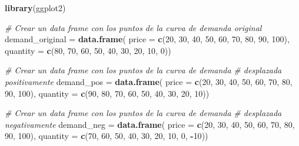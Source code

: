 \documentclass[
  spanish,
  12pt,
]{book}
\newenvironment{Shaded}{\begin{snugshade}}{\end{snugshade}}
\newcommand{\AttributeTok}[1]{\textcolor[rgb]{0.13,0.29,0.53}{#1}}
\newcommand{\CommentTok}[1]{\textcolor[rgb]{0.56,0.35,0.01}{\textit{#1}}}
\newcommand{\DecValTok}[1]{\textcolor[rgb]{0.00,0.00,0.81}{#1}}
\newcommand{\FunctionTok}[1]{\textcolor[rgb]{0.13,0.29,0.53}{\textbf{#1}}}
\newcommand{\NormalTok}[1]{#1}
\newcommand{\OtherTok}[1]{\textcolor[rgb]{0.56,0.35,0.01}{#1}}
\newcommand{\SpecialCharTok}[1]{\textcolor[rgb]{0.81,0.36,0.00}{\textbf{#1}}}
\begin{document}
\begin{Shaded}
\begin{Highlighting}[]
\FunctionTok{library}\NormalTok{(ggplot2)}

\CommentTok{\# Crear un data frame con los puntos de la curva de demanda original}
\NormalTok{demand\_original }\OtherTok{=} \FunctionTok{data.frame}\NormalTok{(}
  \AttributeTok{price =} \FunctionTok{c}\NormalTok{(}\DecValTok{20}\NormalTok{, }\DecValTok{30}\NormalTok{, }\DecValTok{40}\NormalTok{, }\DecValTok{50}\NormalTok{, }\DecValTok{60}\NormalTok{, }\DecValTok{70}\NormalTok{, }\DecValTok{80}\NormalTok{, }\DecValTok{90}\NormalTok{, }\DecValTok{100}\NormalTok{),}
  \AttributeTok{quantity =} \FunctionTok{c}\NormalTok{(}\DecValTok{80}\NormalTok{, }\DecValTok{70}\NormalTok{, }\DecValTok{60}\NormalTok{, }\DecValTok{50}\NormalTok{, }\DecValTok{40}\NormalTok{, }\DecValTok{30}\NormalTok{, }\DecValTok{20}\NormalTok{, }\DecValTok{10}\NormalTok{, }\DecValTok{0}\NormalTok{))}

\CommentTok{\# Crear un data frame con los puntos de la curva de demanda }
\CommentTok{\# desplazada positivamente}
\NormalTok{demand\_pos }\OtherTok{=} \FunctionTok{data.frame}\NormalTok{(}
  \AttributeTok{price =} \FunctionTok{c}\NormalTok{(}\DecValTok{20}\NormalTok{, }\DecValTok{30}\NormalTok{, }\DecValTok{40}\NormalTok{, }\DecValTok{50}\NormalTok{, }\DecValTok{60}\NormalTok{, }\DecValTok{70}\NormalTok{, }\DecValTok{80}\NormalTok{, }\DecValTok{90}\NormalTok{, }\DecValTok{100}\NormalTok{),}
  \AttributeTok{quantity =} \FunctionTok{c}\NormalTok{(}\DecValTok{90}\NormalTok{, }\DecValTok{80}\NormalTok{, }\DecValTok{70}\NormalTok{, }\DecValTok{60}\NormalTok{, }\DecValTok{50}\NormalTok{, }\DecValTok{40}\NormalTok{, }\DecValTok{30}\NormalTok{, }\DecValTok{20}\NormalTok{, }\DecValTok{10}\NormalTok{))}

\CommentTok{\# Crear un data frame con los puntos de la curva de demanda }
\CommentTok{\# desplazada negativamente}
\NormalTok{demand\_neg }\OtherTok{=} \FunctionTok{data.frame}\NormalTok{(}
  \AttributeTok{price =} \FunctionTok{c}\NormalTok{(}\DecValTok{20}\NormalTok{, }\DecValTok{30}\NormalTok{, }\DecValTok{40}\NormalTok{, }\DecValTok{50}\NormalTok{, }\DecValTok{60}\NormalTok{, }\DecValTok{70}\NormalTok{, }\DecValTok{80}\NormalTok{, }\DecValTok{90}\NormalTok{, }\DecValTok{100}\NormalTok{),}
  \AttributeTok{quantity =} \FunctionTok{c}\NormalTok{(}\DecValTok{70}\NormalTok{, }\DecValTok{60}\NormalTok{, }\DecValTok{50}\NormalTok{, }\DecValTok{40}\NormalTok{, }\DecValTok{30}\NormalTok{, }\DecValTok{20}\NormalTok{, }\DecValTok{10}\NormalTok{, }\DecValTok{0}\NormalTok{, }\SpecialCharTok{{-}}\DecValTok{10}\NormalTok{))}


\end{Highlighting}
\end{Shaded}
\end{document}
